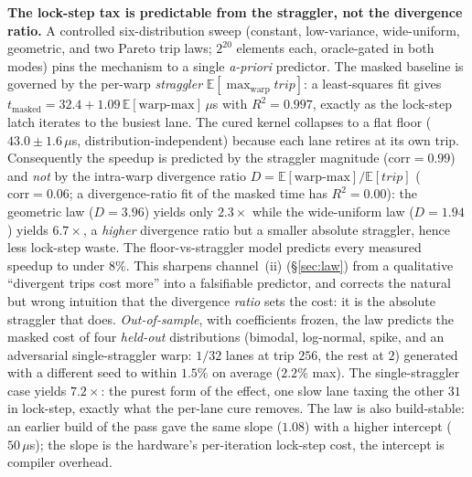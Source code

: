 \documentclass[sigplan,review,anonymous,10pt]{acmart}
\begin{document}
\textbf{The lock-step tax is predictable from the straggler, not the divergence ratio.} A controlled six-distribution sweep (constant, low-variance, wide-uniform, geometric, and two Pareto trip laws; $2^{20}$ elements each, oracle-gated in both modes) pins the mechanism to a single \emph{a-priori} predictor. The masked baseline is governed by the per-warp \emph{straggler} $\mathbb{E}[\max_{\mathrm{warp}}\mathit{trip}]$: a least-squares fit gives $t_{\mathrm{masked}}=32.4+1.09\,\mathbb{E}[\text{warp-max}]\,\mu$s with $R^2=0.997$, exactly as the lock-step latch iterates to the busiest lane. The cured kernel collapses to a flat floor ($43.0\pm1.6\,\mu$s, distribution-independent) because each lane retires at its own trip. Consequently the speedup is predicted by the straggler magnitude ($\mathrm{corr}=0.99$) and \emph{not} by the intra-warp divergence ratio $D=\mathbb{E}[\text{warp-max}]/\mathbb{E}[\mathit{trip}]$ ($\mathrm{corr}=0.06$; a divergence-ratio fit of the masked time has $R^2=0.00$): the geometric law ($D=3.96$) yields only $2.3\times$ while the wide-uniform law ($D=1.94$) yields $6.7\times$, a \emph{higher} divergence ratio but a smaller absolute straggler, hence less lock-step waste. The floor-vs-straggler model predicts every measured speedup to under $8\%$. This sharpens channel~(ii) (\S\ref{sec:law}) from a qualitative ``divergent trips cost more'' into a falsifiable predictor, and corrects the natural but wrong intuition that the divergence \emph{ratio} sets the cost: it is the absolute straggler that does. \emph{Out-of-sample}, with coefficients frozen, the law predicts the masked cost of four \emph{held-out} distributions (bimodal, log-normal, spike, and an adversarial single-straggler warp: $1/32$ lanes at trip $256$, the rest at $2$) generated with a different seed to within $1.5\%$ on average ($2.2\%$ max). The single-straggler case yields $7.2\times$: the purest form of the effect, one slow lane taxing the other $31$ in lock-step, exactly what the per-lane cure removes. The law is also build-stable: an earlier build of the
pass gave the same slope ($1.08$) with a higher intercept ($50\,\mu$s); the slope is the hardware's
per-iteration lock-step cost, the intercept is compiler overhead.
\end{document}
